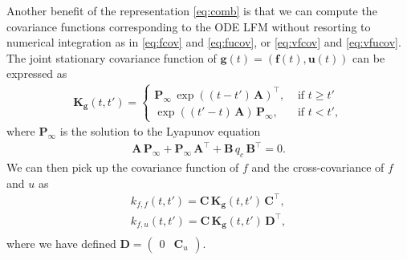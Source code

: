 \documentclass[journal]{IEEEtran}
\begin{document}
Another benefit of the representation \eqref{eq:comb} is that we can compute the covariance functions corresponding to the ODE LFM without resorting to numerical integration as in \eqref{eq:fcov} and \eqref{eq:fucov}, or \eqref{eq:vfcov} and \eqref{eq:vfucov}. The joint stationary covariance function of $\mathbf{g}(t) = (\mathbf{f}(t),\mathbf{u}(t))$ can be expressed as
%
\begin{equation}
\begin{split}
  \mathbf{K}_{\mathbf{g}}(t,t') = \begin{cases}
    \mathbf{P}_\infty \, \exp(( t - t') \, \mathbf{A})^{\top}, &
    \text{ if } t \ge t' \\
    \exp((t' - t) \, \mathbf{A}) \, \mathbf{P}_\infty, &
    \text{ if } t < t',
  \end{cases}
\end{split}
\label{eq:Kg1}
\end{equation}
%
where $\mathbf{P}_\infty$ is the solution to the Lyapunov equation
%
\begin{equation}
\begin{split}
  \mathbf{A} \, \mathbf{P}_\infty + \mathbf{P}_\infty \, \mathbf{A}^{\top}
  + \mathbf{B} \, q_c \, \mathbf{B}^{\top} = 0.
\end{split}
\label{eq:Kg2}
\end{equation}
%
We can then pick up the covariance function of $f$ and the cross-covariance of $f$ and $u$ as
%
\begin{equation}
\begin{split}
  k_{f,f}(t,t') = \mathbf{C} \, \mathbf{K}_{\mathbf{g}}(t,t') \, \mathbf{C}^{\top}, \\
  k_{f,u}(t,t') = \mathbf{C} \, \mathbf{K}_{\mathbf{g}}(t,t') \, \mathbf{D}^{\top}, \\
\end{split}
\label{eq:Kg3}
\end{equation}
%
where we have defined $\mathbf{D} = \begin{pmatrix} 0 & \mathbf{C}_u \end{pmatrix}$.
\end{document}
